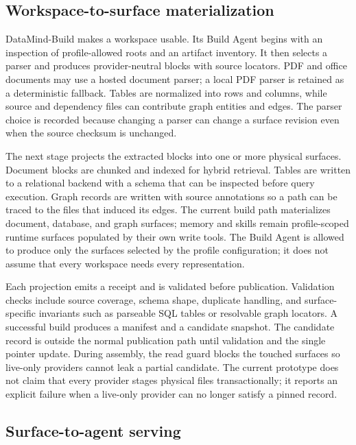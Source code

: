 \subsection{Workspace-to-surface materialization}
\label{sec:build-agent}

DataMind-Build makes a workspace usable. Its Build Agent begins with
an inspection of profile-allowed roots and an artifact inventory. It then
selects a parser and produces provider-neutral blocks with source locators.
PDF and office documents may use a hosted document parser; a local PDF parser
is retained as a deterministic fallback. Tables are normalized into rows and
columns, while source and dependency files can contribute graph entities and
edges. The parser choice is recorded because changing a parser can change a
surface revision even when the source checksum is unchanged.

The next stage projects the extracted blocks into one or more physical
surfaces. Document blocks are chunked and indexed for hybrid retrieval. Tables
are written to a relational backend with a schema that can be inspected before
query execution. Graph records are written with source annotations so a path
can be traced to the files that induced its edges. The current build path
materializes document, database, and graph surfaces; memory and skills remain
profile-scoped runtime surfaces populated by their own write tools. The Build
Agent is allowed to produce only the surfaces selected by the profile
configuration; it does not assume that every workspace needs every
representation.

Each projection emits a receipt and is validated before publication. Validation
checks include source coverage, schema shape, duplicate handling, and
surface-specific invariants such as parseable SQL tables or resolvable graph
locators. A successful build produces a manifest and a candidate snapshot. The
candidate record is outside the normal publication path until validation and
the single pointer update. During assembly, the read guard blocks the touched
surfaces so live-only providers cannot leak a partial candidate. The current
prototype does not claim that every provider stages physical files
transactionally; it reports an explicit failure when a live-only provider can
no longer satisfy a pinned record.

\subsection{Surface-to-agent serving}
\label{sec:serving-agent}

